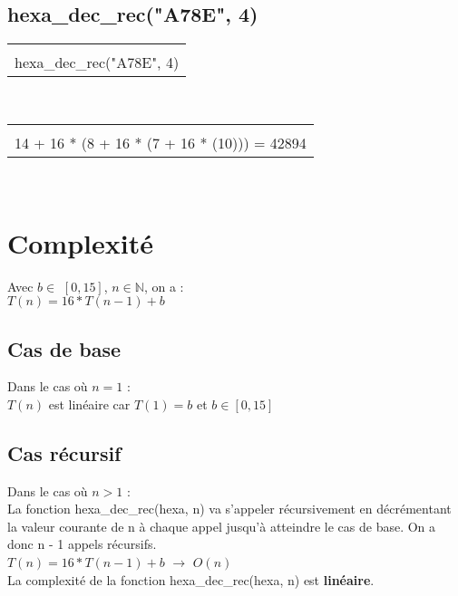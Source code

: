 \documentclass[a4paper, 11pt, oneside]{article}
\begin{document}
\subsection{hexa\_dec\_rec("A78E", 4)}

 \begin{tabular}{|c|}
 \\
 \\
 hexa\_dec\_rec("A78E", 4)\\
 \hline
 \end{tabular}~~
 \begin{tabular}{|c|}
 \\
 \\
 14 + 16 * (8 + 16 * (7 + 16 * (10))) = 42894\\
 \hline
 \end{tabular}~~
 
\section{Complexité}\label{complexite}
%
%

Avec $b \in$ $[0, 15]$, $n \in \mathbb{N}$, on a :\\

$T(n) = 16 * T(n-1) + b$

\subsection{Cas de base}

Dans le cas où $n = 1$ :\\

$T(n)$ est linéaire car $T(1) = b$ et $b \in [0, 15]$

\subsection{Cas récursif}

Dans le cas où $n > 1$ :\\

La fonction hexa\_dec\_rec(hexa, n) va s'appeler récursivement en décrémentant la valeur courante de n à chaque appel jusqu'à atteindre le cas de base.
On a donc n - 1 appels récursifs.\\

$T(n) = 16 * T(n-1) + b$ $\rightarrow$ $O(n)$\\

La complexité de la fonction hexa\_dec\_rec(hexa, n) est \textbf{linéaire}.
\newpage
\end{document}
